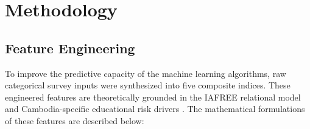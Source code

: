 \documentclass[12pt,journal,compsoc]{IEEEtran}
\begin{document}
\section{Methodology}
\label{sec:methodology}

\subsection{Feature Engineering}
\label{subsec:feature_engineering}
To improve the predictive capacity of the machine learning algorithms, raw categorical survey inputs were synthesized into five composite indices. These engineered features are theoretically grounded in the IAFREE relational model \cite{vasconcelos2023iafree} and Cambodia-specific educational risk drivers \cite{kreng2016school}. The mathematical formulations of these features are described below:
\end{document}
